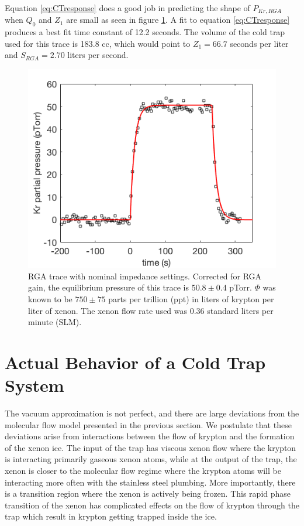 \documentclass[12pt]{article}
\begin{document}
Equation \ref{eq:CTresponse} does a good job in predicting the shape of $P_{Kr,RGA}$ when $Q_0$ and $Z_1$ are small as seen in figure \ref{fig:RGAtrace_fast}. A fit to equation \ref{eq:CTresponse} produces a best fit time constant of 12.2 seconds. The volume of the cold trap used for this trace is 183.8 cc, which would point to $Z_1=66.7$ seconds per liter and $S_{RGA}=2.70$ liters per second. 
\begin{figure}[h!]
\centering
\includegraphics[width=\textwidth]{Figures/RGATrace_fit_fast.png}
\caption{RGA trace with nominal impedance settings. Corrected for RGA gain, the equilibrium pressure of this trace is $50.8 \pm 0.4$ pTorr. $\Phi$ was known to be $750 \pm 75$ parts per trillion (ppt) in liters of krypton per liter of xenon. The xenon flow rate used was 0.36 standard liters per minute (SLM). }
\label{fig:RGAtrace_fast}
\end{figure}





\section{Actual Behavior of a Cold Trap System}
The vacuum approximation is not perfect, and there are large deviations from the molecular flow model presented in the previous section. We postulate that these deviations arise from interactions between the flow of krypton and the formation of the xenon ice. The input of the trap has viscous xenon flow where the krypton is interacting primarily gaseous xenon atoms, while at the output of the trap, the xenon is closer to the molecular flow regime where the krypton atoms will be interacting more often with the stainless steel plumbing. More importantly, there is a transition region where the xenon is actively being frozen. This rapid phase transition of the xenon has complicated effects on the flow of krypton through the trap which result in krypton getting trapped inside the ice. 
\end{document}
